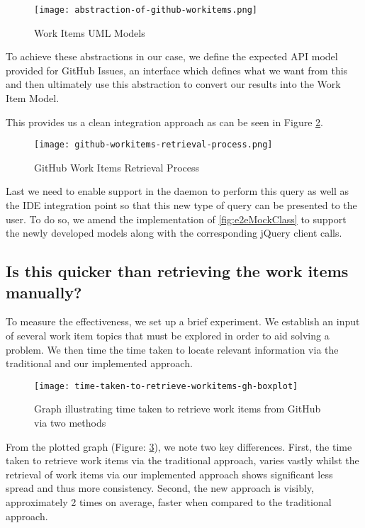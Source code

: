 \begin{figure}[h!]
	\centering
	\texttt{[image: abstraction-of-github-workitems.png]}
	\caption{Work Items UML Models}
	\label{fig:abstractionOfGitHubWorkItems}
\end{figure}

To achieve these abstractions in our case, we define the expected API model provided for GitHub Issues, an interface which defines what we want from this and then ultimately use this abstraction to convert our results into the Work Item Model.

This provides us a clean integration approach as can be seen in Figure \ref{fig:gitHubworkItemsRetrievalProcess}.

\begin{figure}[h!]
	\centering
	\texttt{[image: github-workitems-retrieval-process.png]}
	\caption{GitHub Work Items Retrieval Process}
	\label{fig:gitHubworkItemsRetrievalProcess}
\end{figure}

Last we need to enable support in the daemon to perform this query as well as the IDE integration point so that this new type of query can be presented to the user. To do so, we amend the implementation of \ref{fig:e2eMockClass} to support the newly developed models along with the corresponding jQuery client calls.

\subsection{Is this quicker than retrieving the work items manually?}

To measure the effectiveness, we set up a brief experiment. We establish an input of several work item topics that must be explored in order to aid solving a problem. We then time the time taken to locate relevant information via the traditional and our implemented approach.

\begin{figure}[h]
	\centering
	\texttt{[image: time-taken-to-retrieve-workitems-gh-boxplot]}
	\caption{Graph illustrating time taken to retrieve work items from GitHub via two methods}
	\label{fig:time-taken-to-retrieve-workitems-gh-boxplot}
\end{figure}

From the plotted graph (Figure: \ref{fig:time-taken-to-retrieve-workitems-gh-boxplot}), we note two key differences. First, the time taken to retrieve work items via the traditional approach, varies vastly whilst the retrieval of work items via our implemented approach shows significant less spread and thus more consistency. Second, the new approach is visibly, approximately 2 times on average, faster when compared to the traditional approach. 

